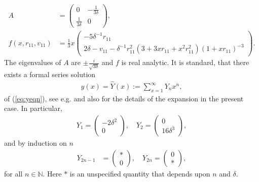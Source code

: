 \documentclass[reqno,12pt]{amsart}
\newcommand{\eqlab}[1]{\label{eq:#1}}
\renewcommand{\eqref}[1]{(\ref{eq:#1})}
\numberwithin{equation}{section}
\begin{document}
\begin{align*}
 A &= \begin{pmatrix}
      0 & -\frac{1}{3\delta}\\
      \frac{1}{3\delta} & 0
     \end{pmatrix},\\
     f(x,r_{11},v_{11}) &= \frac13 x\begin{pmatrix} -5 \delta^{-1} r_{11}\\
  2\delta-v_{11}-\delta^{-1} r_{11}^2\left(3+3x r_{11}+x^2r_{11}^2\right){(1+xr_{11})^{-3}}
 \end{pmatrix}.
\end{align*}
The eigenvalues of $A$ are $\pm \frac{i}{\sqrt{3\delta}}$ and $f$ is real analytic. It is standard, that there exists a formal series solution 
\begin{align}
 y(x) = \widehat Y(x):=\sum_{x=1}^\infty Y_n x^n,\eqlab{Yhat}
\end{align}
of \eqref{yeqn}, see e.g. \cite{bonckaert2008a} and also \cite{haraux2021a} for the details of the expansion in the present case. In particular, 
\begin{align*}
 Y_1 = \begin{pmatrix}
        -2\delta^2 \\
        0
       \end{pmatrix},\quad 
Y_2 = \begin{pmatrix}
        0 \\
        16\delta^3
       \end{pmatrix},
\end{align*} and by induction on $n$
\begin{align}
 Y_{2n-1} &= \begin{pmatrix}
        *\\
        0
       \end{pmatrix},\quad 
Y_{2n} = \begin{pmatrix}
        0\\
        *
       \end{pmatrix},\eqlab{evenodd}
\end{align}
for all $n\in \mathbb N$. Here $*$ is an unspecified quantity that depends upon $n$ and $\delta$. 
\end{document}
